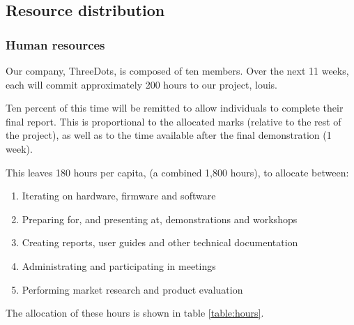 \documentclass{article}
\begin{document}
\subsection{Resource distribution}

\subsubsection{Human resources}

Our company, ThreeDots, is composed of ten members. Over the next 11 weeks, each will commit approximately 200 hours to our project, louis.

Ten percent of this time will be remitted to allow individuals to complete their final report. This is proportional to the allocated marks (relative to the rest of the project), as well as to the time available after the final demonstration (1 week).

This leaves 180 hours per capita, (a combined 1,800 hours), to allocate between:
\begin{enumerate}
  \item Iterating on hardware, firmware and software
  \item Preparing for, and presenting at, demonstrations and workshops
  \item Creating reports, user guides and other technical documentation
  \item Administrating and participating in meetings
  \item Performing market research and product evaluation
\end{enumerate}

The allocation of these hours is shown in table \ref{table:hours}.
\end{document}
